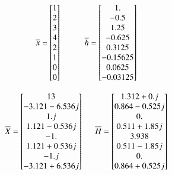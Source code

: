 \documentclass[journal,12pt,twocolumn]{IEEEtran}
\renewcommand\thesection{\arabic{section}}
\begin{document}
\begin{enumerate}[label=\thesection.\arabic*.,ref=\thesection.\theenumi]
\begin{equation}
\overline{x} =
\begin{bmatrix}
1\\2\\3\\4\\2\\1\\0\\0
\end{bmatrix} \hspace{10mm} 
\overline{h} =
\begin{bmatrix}
1. \\     -0.5 \\     1.25 \\   -0.625 \\   0.3125 \\ -0.15625 \\ 0.0625\\  -0.03125
\end{bmatrix}
\end{equation}


\begin{equation}
    \overline{X} =
\begin{bmatrix}
 13 \\   -3.121-6.536j \\  1.j \\     1.121-0.536j \\ -1.\\1.121+0.536j\\ -1.j\\    -3.121+6.536j
\end{bmatrix}
 \hspace{5mm}  \overline{H} =
\begin{bmatrix}
1.312+0.j \\    0.864-0.525j \\ 0.  \\    0.511+1.85j \\ 3.938 \\
 0.511-1.85j \\  0.  \\    0.864+0.525j
\end{bmatrix}
\end{equation}

\begin{figure}[!ht]


\end{figure}
\end{enumerate}
\end{document}

